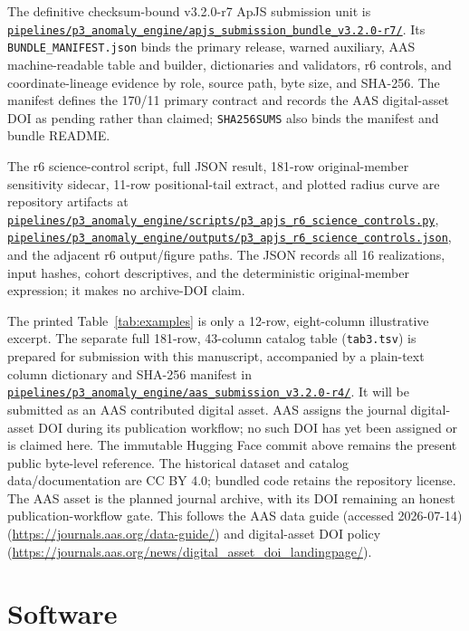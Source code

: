 \documentclass[twocolumn]{aastex701}
\newcommand{\repoBase}{https://github.com/Hubify-Projects/bigbounce/blob/main}
\newcommand{\artifact}[1]{\href{\repoBase/#1}{\nolinkurl{#1}}}
\newcommand{\bundleVersion}{v3.2.0-r7}
\begin{document}
The definitive checksum-bound \bundleVersion{} ApJS submission unit is
\href{https://github.com/Hubify-Projects/bigbounce/tree/main/pipelines/p3_anomaly_engine/apjs_submission_bundle_v3.2.0-r7}{\nolinkurl{pipelines/p3_anomaly_engine/apjs_submission_bundle_v3.2.0-r7/}}.
Its \texttt{BUNDLE\_MANIFEST.json} binds the primary release, warned auxiliary, AAS
machine-readable table and builder, dictionaries and validators, r6 controls, and coordinate-lineage
evidence by role, source path, byte size, and SHA-256.  The manifest defines the 170/11 primary
contract and records the AAS digital-asset DOI as pending rather than claimed; \texttt{SHA256SUMS}
also binds the manifest and bundle README.

The r6 science-control script, full JSON result, 181-row original-member sensitivity sidecar,
11-row positional-tail extract, and plotted radius curve are repository artifacts at
\artifact{pipelines/p3\_anomaly\_engine/scripts/p3\_apjs\_r6\_science\_controls.py},
\artifact{pipelines/p3\_anomaly\_engine/outputs/p3\_apjs\_r6\_science\_controls.json}, and the
adjacent r6 output/figure paths.  The JSON records all 16 realizations, input hashes, cohort
descriptives, and the deterministic original-member expression; it makes no archive-DOI claim.

The printed Table~\ref{tab:examples} is only a 12-row, eight-column illustrative excerpt.  The
separate full 181-row, 43-column catalog table (\texttt{tab3.tsv}) is prepared for submission with
this manuscript, accompanied by a plain-text column dictionary and SHA-256
manifest in
\href{https://github.com/Hubify-Projects/bigbounce/tree/main/pipelines/p3_anomaly_engine/aas_submission_v3.2.0-r4}{\nolinkurl{pipelines/p3_anomaly_engine/aas_submission_v3.2.0-r4/}}.  It will be submitted as an
AAS contributed digital asset.  AAS assigns the journal digital-asset DOI during its publication
workflow; no such DOI has yet been assigned or is claimed here.  The immutable Hugging Face commit
above remains the present public byte-level reference.  The historical dataset and catalog
data/documentation are CC BY 4.0; bundled code retains the repository license.  The AAS asset is
the planned journal archive, with its DOI remaining an honest publication-workflow gate.  This follows the AAS data guide (accessed 2026-07-14)
(\url{https://journals.aas.org/data-guide/}) and digital-asset DOI policy
(\url{https://journals.aas.org/news/digital_asset_doi_landingpage/}).

\section*{Software}
\end{document}
